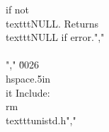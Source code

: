 if not \\texttt{NULL}.  Returns \\texttt{NULL} if error.","        \\\\","    \u0026 \\hspace{.5in}\\it Include: \\rm\\texttt{unistd.h}","        %